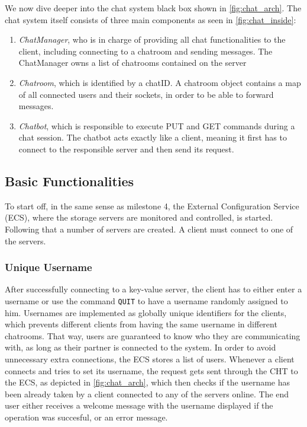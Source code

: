 We now dive deeper into the chat system black box shown in \ref{fig:chat_arch}. The chat system itself consists of three main components as seen in \ref{fig:chat_inside}:

\begin{enumerate}
	\item \textit{ChatManager}, who is in charge of providing all chat functionalities to the client, including connecting to a chatroom and sending messages. The ChatManager owns a list of chatrooms contained on the server
	\item \textit{Chatroom}, which is identified by a chatID. A chatroom object contains a map of all connected users and their sockets, in order to be able to forward messages.
	\item \textit{Chatbot}, which is responsible to execute PUT and GET commands during a chat session. The chatbot acts exactly like a client, meaning it first has to connect to the responsible server and then send its request.
\end{enumerate}

\subsection{Basic Functionalities}
\label{sec:groupchat_functionalities}
To start off, in the same sense as milestone 4, the External Configuration Service (ECS), where the storage servers are monitored and controlled, is started. Following that a number of servers are created. A client must connect to one of the servers.

\subsubsection{Unique Username}
\label{sec:groupchat_funtionalities_uniqueusername}
After successfully connecting to a key-value server, the client has to either enter a username or use the command \texttt{QUIT} to have a username randomly assigned to him. Usernames are implemented as globally unique identifiers for the clients, which prevents different clients from having the same username in different chatrooms. That way, users are guaranteed to know who they are communicating with, as long as their partner is connected to the system.
In order to avoid unnecessary extra connections, the ECS stores a list of users. Whenever a client connects and tries to set its username, the request gets sent through the CHT to the ECS, as depicted in \ref{fig:chat_arch}, which then checks if the username has been already taken by a client connected to any of the servers online. The end user either receives a welcome message with the username displayed if the operation was succesful, or an error message.
 
